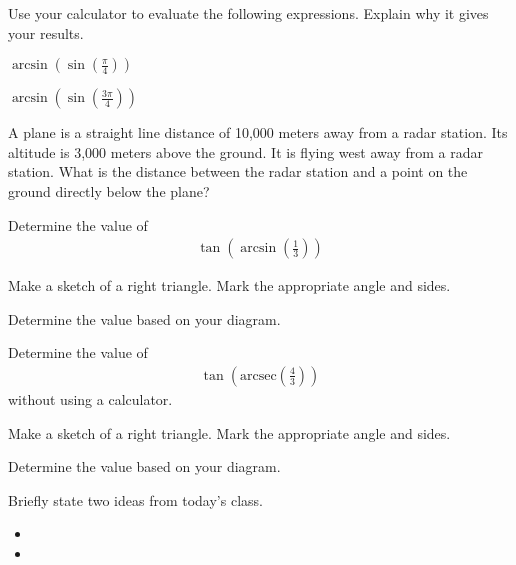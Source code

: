 \begin{problem}
\item Use your calculator to evaluate the following
  expressions. Explain why it gives your results.
  \begin{subproblem}
    \item $\arcsin\left(\sin\left(\frac{\pi}{4}\right)\right)$
      \vfill
    \item $\arcsin\left(\sin\left(\frac{3\pi}{4}\right)\right)$
      \vfill
  \end{subproblem}

  \clearpage

\item A plane is a straight line distance of 10,000 meters away from a
  radar station. Its altitude is 3,000 meters above the ground. It is
  flying west away from a radar station. What is the distance between
  the radar station and a point on the ground directly below the
  plane?
  \vfill

  \clearpage

\item Determine the value of 
  \begin{eqnarray*}
    \tan\left(\arcsin\left(\frac{1}{3}\right)\right)
  \end{eqnarray*}

  \begin{subproblem}
  \item Make a sketch of a right triangle. Mark the appropriate angle
    and sides.
    \vfill
  \item Determine the value based on your diagram.
    \vfill
    \vfill
  \end{subproblem}

  \clearpage

\item Determine the value of 
  \begin{eqnarray*}
    \tan\left(\mathrm{arcsec}\left(\frac{4}{3}\right)\right)
  \end{eqnarray*}
  without using a calculator.

  \begin{subproblem}
  \item Make a sketch of a right triangle. Mark the appropriate angle
    and sides.
    \vfill
  \item Determine the value based on your diagram.
    \vfill
    \vfill
  \end{subproblem}

\end{problem}

\postClass

\begin{problem}
\item Briefly state two ideas from today's class.
  \begin{itemize}
  \item 
  \item 
  \end{itemize}
\item 
  \begin{subproblem}
    \item
  \end{subproblem}
\end{problem}



